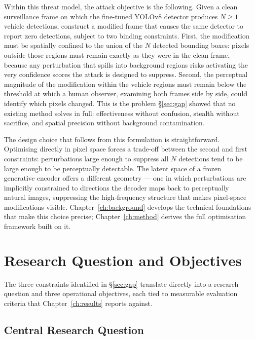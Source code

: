 \documentclass[12pt,a4paper]{report}
\begin{document}
Within this threat model, the attack objective is the following.
Given a clean surveillance frame on which the fine-tuned YOLOv8
detector produces $N \geq 1$ vehicle detections, construct a
modified frame that causes the same detector to report zero
detections, subject to two binding constraints. First, the
modification must be spatially confined to the union of the $N$
detected bounding boxes: pixels outside those regions must remain
exactly as they were in the clean frame, because any perturbation
that spills into background regions risks activating the very
confidence scores the attack is designed to suppress. Second, the
perceptual magnitude of the modification within the vehicle regions
must remain below the threshold at which a human observer, examining
both frames side by side, could identify which pixels changed.
This is the problem \S\ref{sec:gap} showed that no existing method
solves in full: effectiveness without confusion, stealth without
sacrifice, and spatial precision without background contamination.

The design choice that follows from this formulation is
straightforward. Optimising directly in pixel space forces a
trade-off between the second and first constraints: perturbations
large enough to suppress all $N$ detections tend to be large
enough to be perceptually detectable. The latent space of a frozen
generative encoder offers a different geometry --- one in which
perturbations are implicitly constrained to directions the decoder
maps back to perceptually natural images, suppressing the
high-frequency structure that makes pixel-space modifications
visible. Chapter~\ref{ch:background} develops the technical
foundations that make this choice precise; Chapter~\ref{ch:method}
derives the full optimisation framework built on it.

\section{Research Question and Objectives}
\label{sec:objectives}

The three constraints identified in \S\ref{sec:gap} translate
directly into a research question and three operational objectives,
each tied to measurable evaluation criteria that
Chapter~\ref{ch:results} reports against.

\subsection*{Central Research Question}
\end{document}

